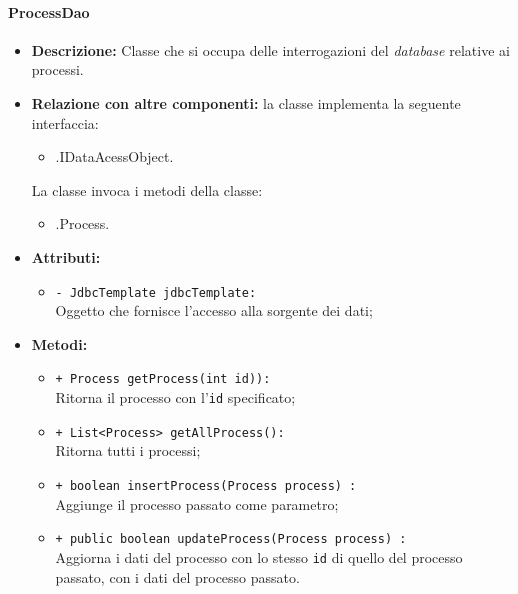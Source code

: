 \paragraph{ProcessDao}
\label{processdao}
\begin{flushleft}
\begin{itemize}
\item \textbf{Descrizione:} Classe che si occupa delle interrogazioni del \textit{database} relative ai processi.
\item \textbf{Relazione con altre componenti:} la classe implementa la seguente interfaccia:
		\begin{itemize}
			\item \smodel{}.IDataAcessObject.
		\end{itemize}
		La classe invoca i metodi della classe:
		\begin{itemize}
			\item \smodel{}.Process.
		\end{itemize}
\item \textbf{Attributi:}
\begin{sloppypar}
\begin{itemize}
\item \texttt{- JdbcTemplate jdbcTemplate:}\\ Oggetto che fornisce l'accesso alla sorgente dei dati;
\end{itemize}
\end{sloppypar}
\item \textbf{Metodi:}
\begin{sloppypar}
\begin{itemize}
\item \texttt{+ Process getProcess(int id)):}\\ Ritorna il processo con l'\texttt{id} specificato; 
\item \texttt{+ List<Process> getAllProcess():}\\ Ritorna tutti i processi;
\item \texttt{+ boolean insertProcess(Process process) :}\\ Aggiunge il processo passato come parametro;
\item \texttt{+ public boolean updateProcess(Process process) :}\\ Aggiorna i dati del processo con lo stesso \texttt{id} di quello del processo passato, con i dati del processo passato.
\end{itemize}
\end{sloppypar}
\end{itemize}
\end{flushleft}

